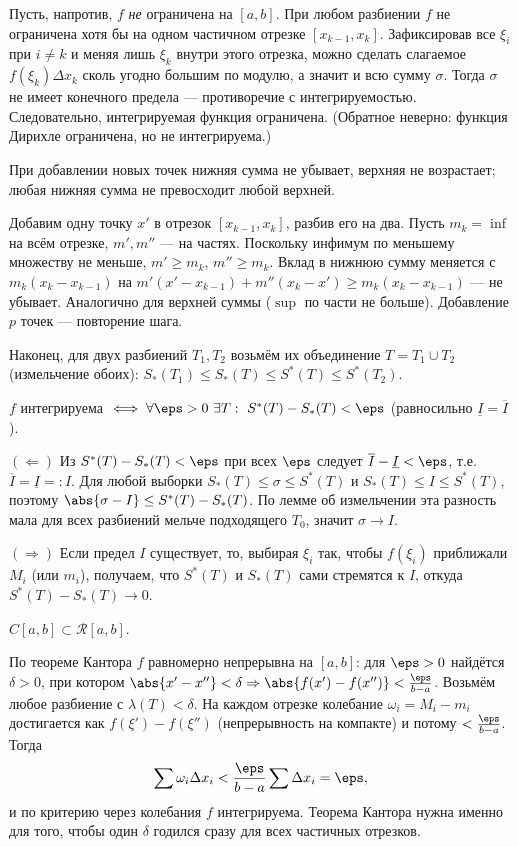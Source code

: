\dok Пусть, напротив, $f$ \emph{не} ограничена на $[a,b]$. При любом разбиении $f$ не ограничена
хотя бы на одном частичном отрезке $[x_{k-1},x_k]$. Зафиксировав все $\xi_i$ при $i\ne k$ и меняя
лишь $\xi_k$ внутри этого отрезка, можно сделать слагаемое $f(\xi_k)\Delta x_k$ сколь угодно
большим по модулю, а значит и всю сумму $\sigma$. Тогда $\sigma$ не имеет конечного предела —
противоречие с интегрируемостью. Следовательно, интегрируемая функция ограничена. (Обратное
неверно: функция Дирихле ограничена, но не интегрируема.)

\stmt При добавлении новых точек нижняя сумма не убывает, верхняя не возрастает; любая нижняя сумма
не превосходит любой верхней.

\dok Добавим одну точку $x'$ в отрезок $[x_{k-1},x_k]$, разбив его на два. Пусть $m_k=\inf$ на всём
отрезке, $m',m''$ — на частях. Поскольку инфимум по меньшему множеству не меньше, $m'\ge m_k$,
$m''\ge m_k$. Вклад в нижнюю сумму меняется с $m_k(x_k-x_{k-1})$ на
$m'(x'-x_{k-1})+m''(x_k-x')\ge m_k(x_k-x_{k-1})$ — не убывает. Аналогично для верхней суммы
($\sup$ по части не больше). Добавление $p$ точек — повторение шага.

Наконец, для двух разбиений $T_1,T_2$ возьмём их объединение $T=T_1\cup T_2$ (измельчение обоих):
$S_*(T_1)\le S_*(T)\le S^*(T)\le S^*(T_2)$.

\stmt $f$ интегрируема $\iff\forall\eps>0\ \exists T:\ S^*(T)-S_*(T)<\eps$ (равносильно
$\underline I=\overline I$).

\dok $(\Leftarrow)$ Из $S^*(T)-S_*(T)<\eps$ при всех $\eps$ следует
$\overline I-\underline I<\eps$, т.е. $\overline I=\underline I=:I$. Для любой выборки
$S_*(T)\le\sigma\le S^*(T)$ и $S_*(T)\le I\le S^*(T)$, поэтому $\abs{\sigma-I}\le S^*(T)-S_*(T)$. По
лемме об измельчении эта разность мала для всех разбиений мельче подходящего $T_0$, значит
$\sigma\to I$.

$(\Rightarrow)$ Если предел $I$ существует, то, выбирая $\xi_i$ так, чтобы $f(\xi_i)$ приближали
$M_i$ (или $m_i$), получаем, что $S^*(T)$ и $S_*(T)$ сами стремятся к $I$, откуда
$S^*(T)-S_*(T)\to0$.

\stmt $C[a,b]\subset\mathcal R[a,b]$.

\dok По теореме Кантора $f$ равномерно непрерывна на $[a,b]$: для $\eps>0$ найдётся $\delta>0$, при
котором $\abs{x'-x''}<\delta\Rightarrow\abs{f(x')-f(x'')}<\tfrac{\eps}{b-a}$. Возьмём любое
разбиение с $\lambda(T)<\delta$. На каждом отрезке колебание $\omega_i=M_i-m_i$ достигается как
$f(\xi')-f(\xi'')$ (непрерывность на компакте) и потому $<\tfrac{\eps}{b-a}$. Тогда
\[
  \sum\omega_i\Delta x_i<\frac{\eps}{b-a}\sum\Delta x_i=\eps,
\]
и по критерию через колебания $f$ интегрируема. Теорема Кантора нужна именно для того, чтобы один
$\delta$ годился сразу для всех частичных отрезков.

